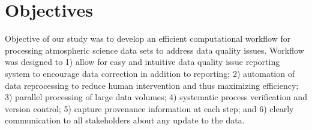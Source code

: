 \section{Objectives}
Objective of our study was to develop an efficient computational
workflow for processing atmospheric science data sets to address data
quality issues. Workflow was designed to 1) allow for easy and intuitive
data quality issue reporting system to encourage data correction in
addition to reporting; 2) automation of data reprocessing to reduce
human intervention and thus maximizing efficiency; 3) parallel
processing of large data volumes; 4) systematic process verification and
version control; 5) capture provenance information at each step; and 6)
clearly communication to all stakeholders about any update to the data.

